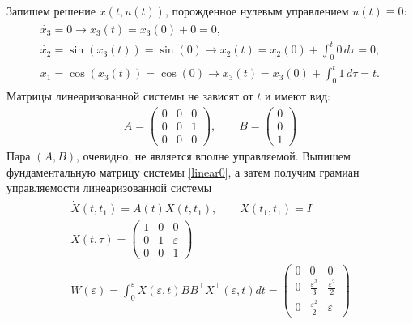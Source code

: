 \documentclass[../main.tex]{subfiles}
\begin{document}
    Запишем решение $ x(t,u(t)) $, порожденное нулевым управлением $ u(t) \equiv 0 $:
    \begin{gather*}
        \begin{gathered}
            \dot{x_3} = 0 \longrightarrow x_3(t) = x_3(0) + 0 = 0, \\
            \dot{x_2} = \sin(x_3(t)) = \sin(0) \longrightarrow x_2(t) = x_2(0) + \int_0^t 0 \, d\tau = 0,\\
            \dot{x_1} = \cos(x_3(t)) = \cos(0) \longrightarrow x_3(t) = x_3(0) + \int_0^t    1 \, d\tau = t.
        \end{gathered}
    \end{gather*}
    Матрицы линеаризованной системы не зависят от $ t $ и имеют вид:
    \begin{gather}\label{linear0}
        A = \begin{pmatrix}
            0 & 0 & 0 \\ 
            0 & 0 & 1 \\ 
            0 & 0 & 0
        \end{pmatrix}, \qquad  B = \begin{pmatrix}
            0 \\ 
            0 \\ 
            1
        \end{pmatrix} 
    \end{gather}
    Пара $ (A,B) $, очевидно, не является вполне управляемой.
    Выпишем фундаментальную матрицу системы \eqref{linear0}, а затем получим грамиан управляемости линеаризованной системы
    \begin{gather*}
        \begin{gathered}
            \dot{X}(t,t_1) = A(t) X(t,t_1), \qquad X(t_1,t_1) = I \\
            X(t,\tau) = \begin{pmatrix}
                1 & 0 & 0 \\ 
                0 & 1 & \varepsilon \\ 
                0 & 0 & 1
            \end{pmatrix}  \\
            W(\varepsilon) = \int_0^{\varepsilon}X(\varepsilon,t) B B^{\top} X^{\top}(\varepsilon,t)dt 
            =\begin{pmatrix}
                0 & 0 & 0 \\
                0 & \frac{\varepsilon^3}{3} & \frac{\varepsilon^2}{2} \\
                0 &  \frac{\varepsilon^2}{2} & \varepsilon
            \end{pmatrix} 
        \end{gathered}
    \end{gather*}
\end{document}

